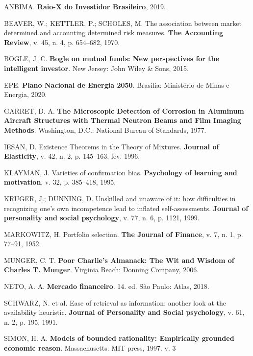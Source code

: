 \documentclass[grad,numbers]{coppe}
\begin{document}
  
  \label{bib:begin}
  \noindent
  
  \setlength{\parindent}{-0.20in}
  \setlength{\leftskip}{0.20in}
  \setlength{\parskip}{8pt}
  
  \hypertarget{refs}{}
  \leavevmode\hypertarget{ref-anbima2019}{}%
  ANBIMA. \textbf{Raio-X do Investidor Brasileiro}, 2019.
  
  \leavevmode\hypertarget{ref-beaver1970}{}%
  BEAVER, W.; KETTLER, P.; SCHOLES, M. The association between market determined and accounting determined risk measures. \textbf{The Accounting Review}, v. 45, n. 4, p. 654--682, 1970.
  
  \leavevmode\hypertarget{ref-bogle2015}{}%
  BOGLE, J. C. \textbf{Bogle on mutual funds: New perspectives for the intelligent investor}. New Jersey: John Wiley \& Sons, 2015.
  
  \leavevmode\hypertarget{ref-epe2020}{}%
  EPE. \textbf{Plano Nacional de Energia 2050}. Brasília: Ministério de Minas e Energia, 2020.
  
  \leavevmode\hypertarget{ref-techreport-exampleIn}{}%
  GARRET, D. A. \textbf{The Microscopic Detection of Corrosion in Aluminum Aircraft Structures with Thermal Neutron Beams and Film Imaging Methods}. Washington, D.C.: National Bureau of Standards, 1977.
  
  \leavevmode\hypertarget{ref-article-example}{}%
  IESAN, D. Existence Theorems in the Theory of Mixtures. \textbf{Journal of Elasticity}, v. 42, n. 2, p. 145--163, fev. 1996.
  
  \leavevmode\hypertarget{ref-klayman1995}{}%
  KLAYMAN, J. Varieties of confirmation bias. \textbf{Psychology of learning and motivation}, v. 32, p. 385--418, 1995.
  
  \leavevmode\hypertarget{ref-kruger1999}{}%
  KRUGER, J.; DUNNING, D. Unskilled and unaware of it: how difficulties in recognizing one's own incompetence lead to inflated self-assessments. \textbf{Journal of personality and social psychology}, v. 77, n. 6, p. 1121, 1999.
  
  \leavevmode\hypertarget{ref-markowitz1952}{}%
  MARKOWITZ, H. Portfolio selection. \textbf{The Journal of Finance}, v. 7, n. 1, p. 77--91, 1952.
  
  \leavevmode\hypertarget{ref-munger2006}{}%
  MUNGER, C. T. \textbf{Poor Charlie's Almanack: The Wit and Wisdom of Charles T. Munger}. Virginia Beach: Donning Company, 2006.
  
  \leavevmode\hypertarget{ref-assafneto2018}{}%
  NETO, A. A. \textbf{Mercado financeiro}. 14. ed. São Paulo: Atlas, 2018.
  
  \leavevmode\hypertarget{ref-schwarz1991}{}%
  SCHWARZ, N. et al. Ease of retrieval as information: another look at the availability heuristic. \textbf{Journal of Personality and Social psychology}, v. 61, n. 2, p. 195, 1991.
  
  \leavevmode\hypertarget{ref-simon1997}{}%
  SIMON, H. A. \textbf{Models of bounded rationality: Empirically grounded economic reason}. Massachusetts: MIT press, 1997. v. 3

  \backmatter
  
  

\end{document}
